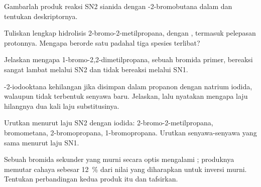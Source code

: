 \begin{exercise}[$\star$]\label{exo:b1:nucleophilic-substitution:4}
Gambarlah produk reaksi SN2 sianida dengan -2-bromobutana dalam
 dan tentukan deskriptornya.
\end{exercise}

\begin{exercise}[$\star\star$]\label{exo:b1:nucleophilic-substitution:5}
Tuliskan  lengkap hidrolisis 2-bromo-2-metilpropana, dengan
, termasuk pelepasan protonnya. Mengapa 
berorde satu padahal tiga spesies terlibat?
\end{exercise}

\begin{exercise}[$\star\star$]\label{exo:b1:nucleophilic-substitution:6}
Jelaskan mengapa 1-bromo-2,2-dimetilpropana, sebuah bromida primer,
bereaksi sangat lambat melalui SN2 dan tidak bereaksi melalui SN1.
\end{exercise}

\begin{exercise}[$\star\star$]\label{exo:b1:nucleophilic-substitution:7}
-2-iodooktana kehilangan  jika disimpan dalam
propanon dengan natrium iodida, walaupun tidak terbentuk senyawa baru.
Jelaskan, lalu nyatakan mengapa laju hilangnya  dua kali
laju substitusinya.
\end{exercise}

\begin{exercise}[$\star\star$]\label{exo:b1:nucleophilic-substitution:8}
Urutkan menurut laju SN2 dengan iodida: 2-bromo-2-metilpropana,
bromometana, 2-bromopropana, 1-bromopropana. Urutkan senyawa-senyawa yang
sama menurut laju  SN1.
\end{exercise}

\begin{exercise}[$\star\star$]\label{exo:b1:nucleophilic-substitution:9}
Sebuah bromida sekunder yang murni secara optis mengalami ;
produknya memutar cahaya sebesar \qty{12}{\percent} dari nilai yang
diharapkan untuk inversi murni. Tentukan perbandingan kedua 
produk itu dan tafsirkan.
\end{exercise}

